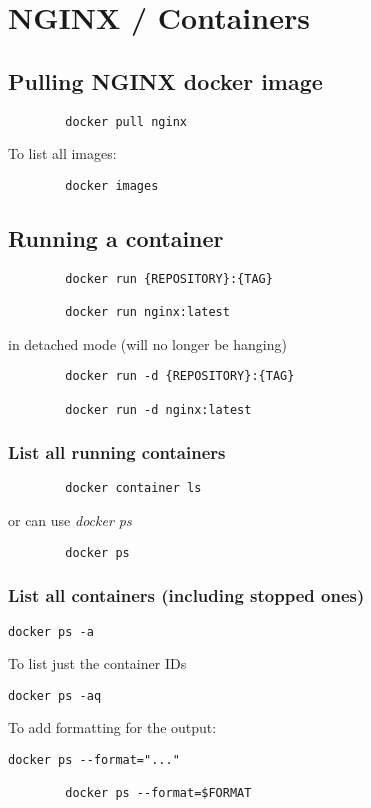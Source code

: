 
\section{NGINX / Containers}

\subsection{Pulling NGINX docker image}
\begin{lstlisting}
        docker pull nginx
\end{lstlisting}
To list all images:
\begin{lstlisting}
        docker images
\end{lstlisting}

\subsection{Running a container}
\begin{lstlisting}
        docker run {REPOSITORY}:{TAG}

        docker run nginx:latest
\end{lstlisting}
in detached mode (will no longer be hanging)
\begin{lstlisting}
        docker run -d {REPOSITORY}:{TAG}

        docker run -d nginx:latest
\end{lstlisting}

\subsubsection{List all running containers}
\begin{lstlisting}
        docker container ls
\end{lstlisting}
or can use \it{docker ps}
\begin{lstlisting}
        docker ps
\end{lstlisting}

\subsubsection{List all containers (including stopped ones)}
\begin{lstlisting}[label={lst:lstlisting2}]
        docker ps -a
\end{lstlisting}
To list just the container IDs
\begin{lstlisting}[label={lst:lstlisting}]
        docker ps -aq
\end{lstlisting}
To add formatting for the output:
\begin{lstlisting}[label={lst:lstlisting4}]
        docker ps --format="..."

        docker ps --format=$FORMAT
\end{lstlisting}


